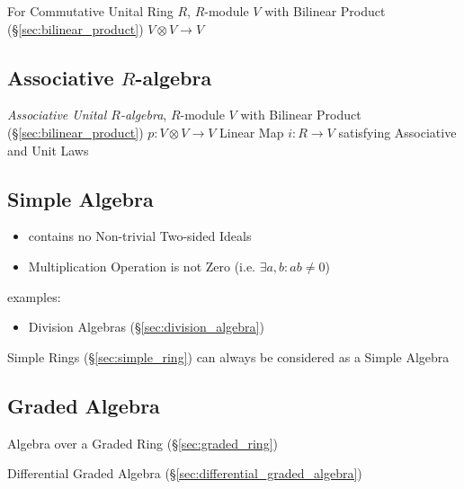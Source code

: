 {{For Commutative Unital Ring $R$, $R$-module $V$ with Bilinear Product
(\S\ref{sec:bilinear_product}) $V \otimes V \rightarrow V$



\subsection{Associative $R$-algebra}\label{sec:associative_r_algebra}

\emph{Associative Unital $R$-algebra}, $R$-module $V$ with Bilinear
Product (\S\ref{sec:bilinear_product}) $p : V \otimes V \rightarrow V$
Linear Map $i : R \rightarrow V$ satisfying Associative and Unit Laws



\subsection{Simple Algebra}\label{sec:simple_algebra}

\begin{itemize}
  \item contains no Non-trivial Two-sided Ideals
  \item Multiplication Operation is not Zero (i.e. $\exists a, b : ab \neq 0$)
\end{itemize}

examples:
\begin{itemize}
  \item Division Algebras (\S\ref{sec:division_algebra})
\end{itemize}

Simple Rings (\S\ref{sec:simple_ring}) can always be considered as a Simple
Algebra



\subsection{Graded Algebra}\label{sec:graded_algebra}

Algebra over a Graded Ring (\S\ref{sec:graded_ring})

Differential Graded Algebra (\S\ref{sec:differential_graded_algebra})

}}
